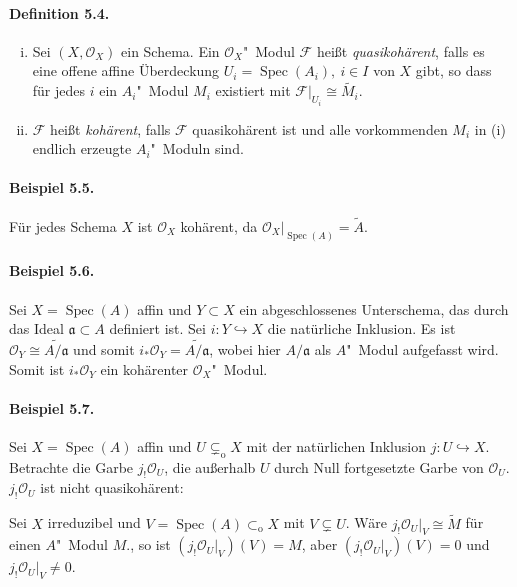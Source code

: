 \paragraph{Definition 5.4.}\label{5.4} \begin{enumerate}[(i)]
\item Sei $(X,\mathcal{O}_X)$ ein Schema. Ein $\mathcal{O}_X$"~Modul $\mathcal{F}$ heißt \textit{quasikohärent}, falls es eine offene affine Überdeckung $U_i=\operatorname{Spec}(A_i),\ i\in I$ von $X$ gibt, so dass für jedes $i$ ein $A_i$"~Modul $M_i$ existiert mit $\mathcal{F}|_{U_i}\cong\widetilde{M_i}$.
\item $\mathcal{F}$ heißt \textit{kohärent}, falls $\mathcal{F}$ quasikohärent ist und alle vorkommenden $M_i$ in (i) endlich erzeugte $A_i$"~Moduln sind.
\end{enumerate}

\paragraph{Beispiel 5.5.}\label{5.5} Für jedes Schema $X$ ist $\mathcal{O}_X$ kohärent, da $\mathcal{O}_X|_{\operatorname{Spec}(A)}=\widetilde{A}$.

\paragraph{Beispiel 5.6.}\label{5.6} Sei $X=\operatorname{Spec}(A)$ affin und $Y\subset X$ ein abgeschlossenes Unterschema, das durch das Ideal $\mathfrak{a}\subset A$ definiert ist. Sei $i:Y\hookrightarrow X$ die natürliche Inklusion. Es ist $\mathcal{O}_Y\cong\widetilde{A/\mathfrak{a}}$ und somit $i_\ast\mathcal{O}_Y=\widetilde{A/\mathfrak{a}}$, wobei hier $A/\mathfrak{a}$ als $A$"~Modul aufgefasst wird. Somit ist $i_\ast\mathcal{O}_Y$ ein kohärenter $\mathcal{O}_X$"~Modul.

\paragraph{Beispiel 5.7.}\label{5.7} Sei $X=\operatorname{Spec}(A)$ affin und $U\subsetneq_\text{o}X$ mit der natürlichen Inklusion $j:U\hookrightarrow X$. Betrachte die Garbe $j_!\mathcal{O}_U$, die außerhalb $U$ durch Null fortgesetzte Garbe von $\mathcal{O}_U$. $j_!\mathcal{O}_U$ ist nicht quasikohärent:

Sei $X$ irreduzibel und $V=\operatorname{Spec}(A)\subset_\text{o}X$ mit $V\subsetneq U$. Wäre $j_!\mathcal{O}_U|_V\cong\widetilde{M}$ für einen $A$"~Modul $M$., so ist $(j_!\mathcal{O}_U|_V)(V)=M$, aber $(j_!\mathcal{O}_U|_V)(V)=0$ und $j_!\mathcal{O}_U|_V\neq 0$.

